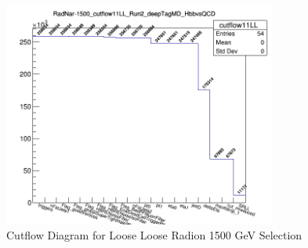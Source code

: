 \begin{figure}[!htb]
	\centering
    \includegraphics[width=0.8\textwidth]{Figures/radnar1500_cutflow11LL_Run2_deepTagMD_HbbvsQCD.png}
	\caption{Cutflow Diagram for Loose Loose Radion 1500 GeV Selection}
	\label{fig:11CutflowsigLL}
\end{figure}

\clearpage
